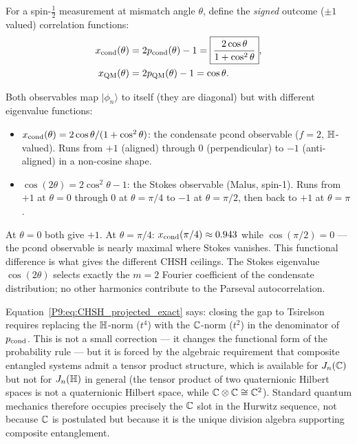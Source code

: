 \begin{definition}
For a spin-$\tfrac{1}{2}$ measurement at mismatch angle $\theta$,
define the \emph{signed} outcome ($\pm1$ valued) correlation functions:
\begin{align}
  x_{\mathrm{cond}}(\theta) &= 2p_{\mathrm{cond}}(\theta) - 1
  = \boxed{\frac{2\cos\theta}{1+\cos^2\theta}}, \label{P9:eq:xcond}\\
  x_\mathrm{QM}(\theta) &= 2p_{\mathrm{QM}}(\theta) - 1 = \cos\theta. \label{P9:eq:xQM}
\end{align}
\end{definition}

\begin{remark}
\label{P9:rem:stokes_vs_pcond}
Both observables map $|\phi_n\rangle$ to itself (they are diagonal)
but with different eigenvalue functions:
\begin{itemize}[noitemsep]
\item $x_{\mathrm{cond}}(\theta) = 2\cos\theta/(1+\cos^2\theta)$: the condensate
  pcond observable ($f=2$, $\mathbb{H}$-valued). Runs from $+1$ (aligned)
  through 0 (perpendicular) to $-1$ (anti-aligned) in a non-cosine shape.
\item $\cos(2\theta) = 2\cos^2\theta-1$: the Stokes observable (Malus,
  spin-1). Runs from $+1$ at $\theta=0$ through 0 at $\theta=\pi/4$
  to $-1$ at $\theta=\pi/2$, then back to $+1$ at $\theta=\pi$.
\end{itemize}
At $\theta=0$ both give $+1$.
At $\theta=\pi/4$: $x_{\mathrm{cond}}(\pi/4)\approx0.943$ while $\cos(\pi/2)=0$ ---
the pcond observable is nearly maximal where Stokes vanishes.
This functional difference is what gives the different CHSH ceilings.
The Stokes eigenvalue $\cos(2\theta)$ selects exactly the $m=2$ Fourier
coefficient of the condensate distribution; no other harmonics contribute
to the Parseval autocorrelation.
\end{remark}

\begin{remark}
\label{P9:rem:geometric_interp_hh_cc}
Equation~\eqref{P9:eq:CHSH_projected_exact} says: closing the gap to Tsirelson
requires replacing the $\mathbb{H}$-norm ($t^4$) with the $\mathbb{C}$-norm ($t^2$)
in the denominator of $p_{\mathrm{cond}}$.
This is not a small correction — it changes the functional form of the
probability rule — but it is forced by the algebraic requirement that
composite entangled systems admit a tensor product structure, which is
available for $J_n(\mathbb{C})$ but not for $J_n(\mathbb{H})$ in general (the
tensor product of two quaternionic Hilbert spaces is not a quaternionic
Hilbert space, while $\mathbb{C}\otimes\mathbb{C}\cong\mathbb{C}^2$).
Standard quantum mechanics therefore occupies precisely the $\mathbb{C}$ slot
in the Hurwitz sequence, not because $\mathbb{C}$ is postulated but because it
is the unique division algebra supporting composite entanglement.
\end{remark}


